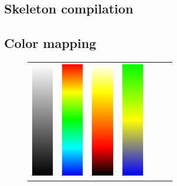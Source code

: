 \subsection{Skeleton compilation}
\subsection{Color mapping}

\begin{figure}[htbp]
    \centering
    \begin{tabular}{ccccccc}
    \includegraphics[height=2in]{figures/colormaps/grayscale.png}&
      \includegraphics[height=2in]{figures/colormaps/rainbow.png}&
      \includegraphics[height=2in]{figures/colormaps/heatmap.png}&         
     \includegraphics[height=2in]{figures/colormaps/blueYellowGreen.png}&

\end{tabular}
\end{figure}
